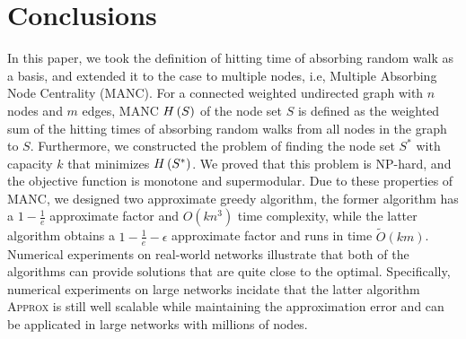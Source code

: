 \documentclass[sigconf]{acmart}
\begin{document}
\section{Conclusions}\label{sec:conc}

In this paper, we took the definition of hitting time of absorbing random walk as a basis, and extended it to the case to multiple nodes, i.e, Multiple Absorbing Node Centrality (MANC).
For a connected weighted undirected graph with \(n\) nodes and \(m\) edges, MANC \(H\left(S\right)\) of the node set \(S\) is defined as the weighted sum of the hitting times of absorbing random walks from all nodes in the graph to \(S\).
Furthermore, we constructed the problem of finding the node set \(S^*\) with capacity \(k\) that minimizes \(H\left(S^*\right)\).
We proved that this problem is NP-hard, and the objective function is monotone and supermodular.
Due to these properties of MANC, we designed two approximate greedy algorithm, the former algorithm has a \(1-\frac1e\) approximate factor and \(O(kn^3)\) time complexity, while the latter algorithm obtains a \(1-\frac1e-\epsilon\) approximate factor and runs in time \(\tilde{O}(km)\).
Numerical experiments on real-world networks illustrate that both of the algorithms can provide solutions that are quite close to the optimal.
Specifically, numerical experiments on large networks incidate that the latter algorithm \textsc{Approx} is still well scalable while maintaining the approximation error and can be applicated in large networks with millions of nodes.


\balance

\end{document}
